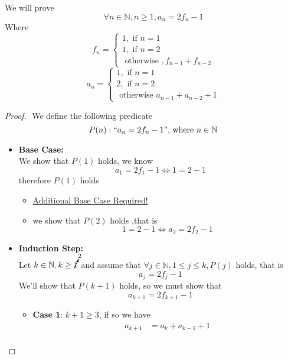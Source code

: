 \documentclass[11pt]{book}
\begin{document}
We will prove 
\[
\forall n \in \mathbb{N} , n\ge 1, a_{n} = 2f_{n}  - 1
\]
Where 
\[
    f_{n}  = 
    \begin{cases}
        1, \text{ if } n= 1\\
        1, \text{ if } n= 2\\
        \text{ otherwise  }, f_{n - 1}  + f_{n  - 2} 
    \end{cases}
\]
\[
a_{n} = 
\begin{cases}
    1, \text{ if } n = 1\\
    2, \text{ if } n= 2 \\
    \text{ otherwise  } a_{n  - 1}  + a_{n - 2}  + 1

\end{cases}
\]

\begin{proof}
    $ $\newline
    We define the following predicate
    \[
    P(n): `` a_{n} = 2f_{n}  - 1 "\text{, where } n \in \mathbb{N} 
    \]
    \begin{itemize}
        \item \textbf{Base Case:}\\
            We show that $P(1)$ holds, we know 
            \[
                a_{1} = 2f_{1} -1 \Leftrightarrow 1= 2 - 1
            \]
            therefore $P\left(1\right) $ holds 
            \begin{itemize}
                \item \underline{Additional Base Case Required!} 
                \item we show that $P\left(2\right) $ holds ,that is 
                    \[
                    1 = 2  - 1 \Leftrightarrow a_{2} = 2f_{2}  - 1
                    \]
            \end{itemize}
        \item \textbf{Induction Step:}\\
            Let $k \in \mathbb{N}, k \ge \cancelto{2}{1}$ and assume that $\forall j \in \mathbb{N} , 1 \le  j \le k, P\left(j\right)$ holds, that is 
            \[
                a_{j} = 2f_{j}  - 1
            \]
            We'll show that $P(k + 1)$ holds, so we must show that 
            \[
            a_{k + 1} = 2f_{k + 1}  - 1
            \]
            \begin{itemize}
                \item \textbf{Case 1}: $k + 1 \ge 3$,  if so we have
                    \begin{align*}
                        a_{k + 1} &= a_{k}  + a_{k - 1}  + 1  \tag{$\alpha$ }\\ 

\end{align*}
\end{itemize}
\end{itemize}
\end{proof}
\end{document}
